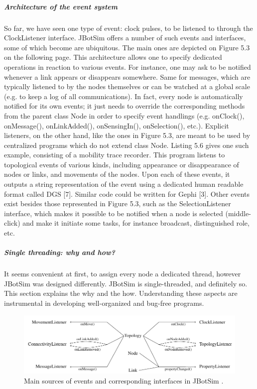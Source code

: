 \subparagraph{Architecture of the event system}
So far, we have seen one type of event: clock pulses, to be listened to through the ClockListener interface. JBotSim offers a number of such events and interfaces, some of which become are ubiquitous. The main ones are depicted on Figure 5.3 on the following page. This architecture allows one to specify dedicated operations in reaction to various events. For instance, one may ask to be notified whenever a link appears or disappears somewhere. Same for messages, which are typically listened to by the nodes themselves or can be watched at a global scale (e.g. to keep a log of all communications). In fact, every node is automatically notified for its own events; it just needs to override the corresponding methods from the parent class Node in order to specify event handlings (e.g. onClock(), onMessage(), onLinkAdded(), onSensingIn(), onSelection(), etc.). Explicit listeners, on the other hand, like the ones in Figure 5.3, are meant to be used by centralized programs which do not extend class Node. Listing 5.6 gives one such example, consisting of a mobility trace recorder. This program listens to topological events of various kinds, including appearance or disappearance of nodes or links, and movements of the nodes. Upon each of these events, it outputs a string representation of the event using a dedicated human readable format called DGS [7]. Similar code could be written for Gephi [3]. Other events exist besides those represented in Figure 5.3, such as the SelectionListener interface, which makes it possible to be notified when a node is selected (middle-click) and make it initiate some tasks, for instance broadcast, distinguished role, etc.
\subparagraph{Single threading: why and how?}It seems convenient at first, to assign every node a dedicated thread, however JBotSim was designed differently. JBotSim is single-threaded, and definitely so. This section explains the why and the how. Understanding these aspects are instrumental in developing well-organized and bug-free programs.
\begin{figure}[h!]
	\centering
	\includegraphics[width=1\linewidth]{fig_4}
	\caption[Main sources of events and corresponding interfaces in  JBotSim .]{Main sources of events and corresponding interfaces in  JBotSim .}
	\label{fig:fig4}
\end{figure}
